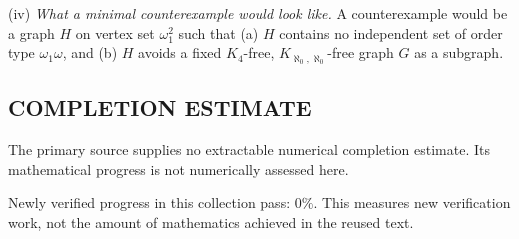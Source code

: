 (iv) \emph{What a minimal counterexample would look like.} A counterexample would be a graph $H$ on vertex set $\omega_1^2$ such that (a) $H$ contains no independent set of order type $\omega_1\omega$, and (b) $H$ avoids a fixed $K_4$-free, $K_{\aleph_0,\aleph_0}$-free graph $G$ as a subgraph.




\subsection*{COMPLETION ESTIMATE}
The primary source supplies no extractable numerical completion estimate. Its mathematical progress is not numerically assessed here.

Newly verified progress in this collection pass: $0\%$. This measures new verification work, not the amount of mathematics achieved in the reused text.
